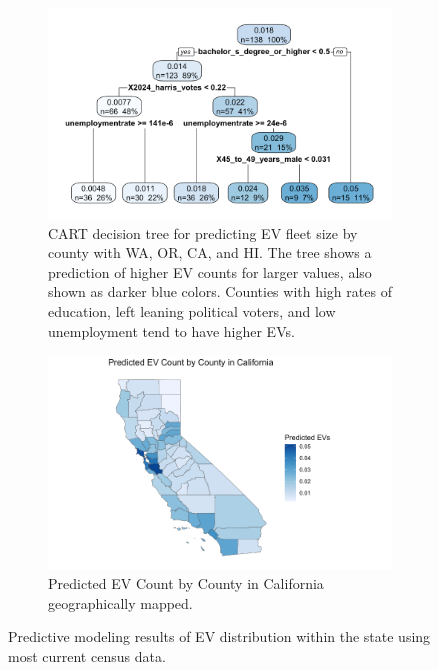 \documentclass[12pt, letterpaper]{article}
\begin{document}
\begin{figure}[H]
     \centering
     \begin{subfigure}[b]{0.9\textwidth}
         \centering
         \includegraphics[width=\textwidth]{cart_model.png}
         \caption{CART decision tree for predicting EV fleet size by county with WA, OR, CA, and HI. The tree shows a prediction of higher EV counts for larger values, also shown as darker blue colors. Counties with high rates of education, left leaning political voters, and low unemployment tend to have higher EVs.}
         \label{fig:cart_tree}
     \end{subfigure}
     \vfill
     \begin{subfigure}[b]{0.9\textwidth}
         \centering
         \includegraphics[width=\textwidth]{california_ev_map.png}
         \caption{Predicted EV Count by County in California geographically mapped.}
         \label{fig:ca_map}
     \end{subfigure}
        \caption{Predictive modeling results of EV distribution within the state using most current census data.}
        \label{fig:ev_prediction}
\end{figure}
\end{document}
